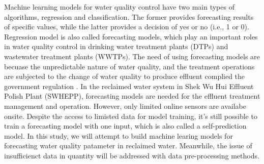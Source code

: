Machine learning models for water quality control have two main types of algorithms, regression and classification. The former provides forecasting results of specific values, while the latter provides a decision of yes or no (i.e., 1 or 0). Regression model is also called forecasting models, which play an important roles in water quality control in drinking water treatment plants (DTPs) 
and wastewater treatment plants (WWTPs). The need of using forecasting models are becuase the unpredictable nature of water quality, and the treatment operations are subjected to the change of water quality to produce effluent complied the government regulation \cite{chenAssessingWastewaterReclamation2003}. In the reclaimed water system in Shek Wu Hui Effluent Polish Plant (SWHEPP), forecasting models are needed for the effluent treatment management and operation. However, only limited online sensors are availabe onsite. Despite the access to limisted data for model training, it's still possible to train a forecasting model with one input, which is also called a self-prediction model. In this study, we will attempt to build machine learing models for forecasting water quality patameter in reclaimed water. Meanwhile, the issue of insufficienct data in quantity will be addressed with data pre-processing methods. 








